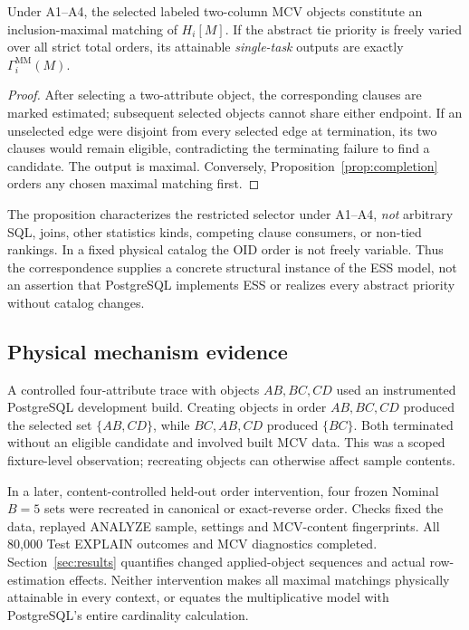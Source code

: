 \documentclass[sigconf, nonacm]{acmart}
\begin{document}
\begin{proposition}
\label{prop:pg}
Under A1--A4, the selected labeled two-column MCV
objects constitute an inclusion-maximal matching of \(H_i[M]\).
If the abstract tie priority is freely varied over all strict
total orders, its attainable \emph{single-task} outputs
are exactly \(\Gamma_i^{\mathrm{MM}}(M)\).
\end{proposition}
\begin{proof}
After selecting a two-attribute object, the corresponding
clauses are marked estimated; subsequent selected objects
cannot share either endpoint. If an unselected edge were
disjoint from every selected edge at termination, its two
clauses would remain eligible, contradicting the terminating
failure to find a candidate. The output is maximal.
Conversely, Proposition~\ref{prop:completion}
orders any chosen maximal matching first.
\end{proof}
The proposition characterizes the restricted selector
under A1--A4, \emph{not} arbitrary SQL, joins,
other statistics kinds, competing clause consumers, or
non-tied rankings. In a fixed physical catalog the OID
order is not freely variable. Thus the correspondence
supplies a concrete structural instance of the ESS model,
not an assertion that PostgreSQL implements ESS or
realizes every abstract priority without catalog changes.

\subsection{Physical mechanism evidence}
A controlled four-attribute trace with objects \(AB,BC,CD\)
used an instrumented PostgreSQL development build. Creating
objects in order \(AB,BC,CD\) produced the selected set
\(\{AB,CD\}\), while \(BC,AB,CD\) produced
\(\{BC\}\). Both terminated without an eligible candidate
and involved built MCV data. This was a scoped fixture-level
observation; recreating objects can otherwise affect sample
contents.

In a later, content-controlled held-out order intervention,
four frozen Nominal \(B=5\) sets were recreated in canonical
or exact-reverse order. Checks fixed the data, replayed
ANALYZE sample, settings and MCV-content fingerprints.
All 80,000 Test EXPLAIN outcomes and MCV diagnostics
completed. Section~\ref{sec:results} quantifies changed
applied-object sequences and actual row-estimation effects.
Neither intervention makes all maximal matchings physically
attainable in every context, or equates the multiplicative
model with PostgreSQL's entire cardinality calculation.
\end{document}
